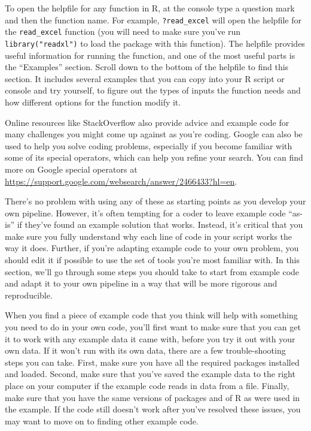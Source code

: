 \documentclass[]{tufte-book}
\begin{document}
To open the helpfile for any function in R, at the console type a question mark
and then the function name. For example, \texttt{?read\_excel} will open the helpfile
for the \texttt{read\_excel} function (you will need to make sure you've run
\texttt{library("readxl")} to load the package with this function). The helpfile
provides useful information for running the function, and one of the most useful
parts is the ``Examples'' section. Scroll down to the bottom of the helpfile to
find this section. It includes several examples that you can copy into your R
script or console and try yourself, to figure out the types of inputs the
function needs and how different options for the function modify it.

Online resources like StackOverflow also provide advice and example code for
many challenges you might come up against as you're coding. Google can also be
used to help you solve coding problems, especially if you become familiar with
some of its special operators, which can help you refine your search. You can
find more on Google special operators at
\url{https://support.google.com/websearch/answer/2466433?hl=en}.

There's no problem with using any of these as starting points as you develop
your own pipeline. However, it's often tempting for a coder to leave
example code ``as-is'' if they've found an example solution that works. Instead,
it's critical that you make sure you fully understand why each line of code in
your script works the way it does. Further, if you're adapting example code to
your own problem, you should edit it if possible to use the set of tools you're
most familiar with. In this section, we'll go through some steps you should
take to start from example code and adapt it to your own pipeline in a way
that will be more rigorous and reproducible.

When you find a piece of example code that you think will help with something
you need to do in your own code, you'll first want to make sure that you can get
it to work with any example data it came with, before you try it out with your
own data. If it won't run with its own data, there are a few trouble-shooting
steps you can take. First, make sure you have all the required packages
installed and loaded. Second, make sure that you've saved the example data to
the right place on your computer if the example code reads in data from a file.
Finally, make sure that you have the same versions of packages and of R as were
used in the example. If the code still doesn't work after you've resolved these
issues, you may want to move on to finding other example code.
\end{document}
